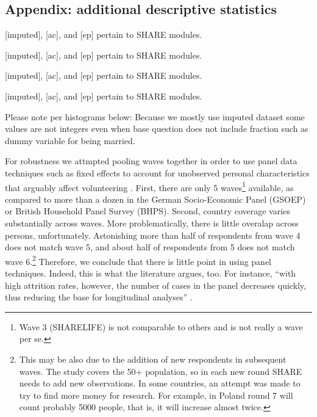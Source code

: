 \documentclass[10pt, letterpaper]{article}
\begin{document}
\begin{spacing}{1.4}


\begin{spacing}{.9}

\section{Appendix: additional descriptive statistics}

 
{\footnotesize [imputed], [ac], and [ep] pertain to SHARE modules.}
 
{\footnotesize [imputed], [ac], and [ep] pertain to SHARE modules.}
 
{\footnotesize [imputed], [ac], and [ep] pertain to SHARE modules.}
 
{\footnotesize [imputed], [ac], and [ep] pertain to SHARE modules.}

Please note per histograms below: Because we mostly use imputed dataset some values are not integers even when base
question does not include fraction such as dummy variable for being married. 








For robustness we attmpted pooling waves together in order to use panel data
techniques such as fixed effects to account for unobserved personal
characteristics that arguably affect volunteering \citep{meier08}. 
First, there are only 5 waves\footnote{Wave 3 (SHARELIFE) is not comparable to others and
is not really a wave per se.} available, as compared to more than a
dozen in the German Socio-Economic Panel (GSOEP) or British Household Panel
Survey (BHPS). Second, country coverage varies substantially across waves.
 More problematically, there is little overalap across persons, unfortunately.
Astonishing more than half of respondents from wave 4 does not match wave 5, and
about half of respondents from 5 does not match wave 6.\footnote{%
This may be also due
  to the addition of new respondents in subsequent waves. The study covers the 50+ population,
  so in each new round SHARE needs to add new observations. In some
  countries, an attempt was made to try to find more money for research. For
  example, in Poland round 7 will count probably 5000 people, that is, it will
  increase almost twice.}  Therefore, we conclude
that there is little point in using panel techniques.
%
Indeed, this is what the literature argues, too. For instance, ``with 
high attrition rates, however, the number of cases  in the panel decreases quickly, 
thus  reducing  the  base  for  longitudinal  analyses'' \citep{blom2011sample}. 



\end{spacing}
\end{spacing}
\end{document}
